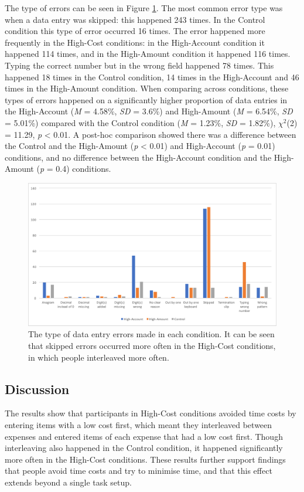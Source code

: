 The type of errors can be seen in Figure \ref{fig:ch34_5-typeoferrors}. The most common error type was when a data entry was skipped: this happened 243 times. %
In the Control condition this type of error occurred 16 times. The error happened more frequently in the High-Cost conditions: in the High-Account condition it happened 114 times, and in the High-Amount condition it happened 116 times.
Typing the correct number but in the wrong field happened 78 times. This happened 18 times in the Control condition, 14 times in the High-Account and 46 times in the High-Amount condition.
When comparing across conditions, these types of errors happened on a significantly higher proportion of data entries in the High-Account (\textit{M} = 4.58\%, \textit{SD} = 3.6\%) and High-Amount (\textit{M} = 6.54\%, \textit{SD} = 5.01\%) compared with the Control condition (\textit{M} = 1.23\%, \textit{SD} = 1.82\%),  $\chi^2$(2) = 11.29, \textit{p} < 0.01.  A post-hoc comparison showed there was a difference between the Control and the High-Amount (\textit{p} < 0.01) and High-Account (\textit{p} = 0.01) conditions, and no difference between the High-Account condition and the High-Amount (\textit{p} = 0.4) conditions.

\begin{figure}
\includegraphics[width=\textwidth]{images/ch34/ch34-5_TypeofErrors.pdf}
    \caption{The type of data entry errors made in each condition. It can be seen that skipped errors occurred more often in the High-Cost conditions, in which people interleaved more often.}\label{fig:ch34_5-typeoferrors}
\end{figure}

\subsection{Discussion}
The results show that participants in High-Cost conditions avoided time costs by entering items with a low cost first, which meant they interleaved between expenses and entered items of each expense that had a low cost first. Though interleaving also happened in the Control condition, it happened significantly more often in the High-Cost conditions. These results further support findings that people avoid time costs and try to minimise time, and that this effect extends beyond a single task setup.

